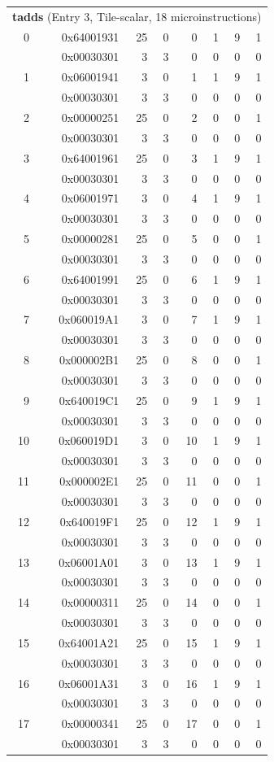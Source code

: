 \begin{longtable}{r r r r r r r r}
\multicolumn{8}{l}{\textbf{tadds} (Entry 3, Tile-scalar, 18 microinstructions)} \\
0 & 0x64001931 & 25 & 0 & 0 & 1 & 9 & 1 \\
  & 0x00030301 & 3 & 3 & 0 & 0 & 0 & 0 \\
1 & 0x06001941 & 3 & 0 & 1 & 1 & 9 & 1 \\
  & 0x00030301 & 3 & 3 & 0 & 0 & 0 & 0 \\
2 & 0x00000251 & 25 & 0 & 2 & 0 & 0 & 1 \\
  & 0x00030301 & 3 & 3 & 0 & 0 & 0 & 0 \\
3 & 0x64001961 & 25 & 0 & 3 & 1 & 9 & 1 \\
  & 0x00030301 & 3 & 3 & 0 & 0 & 0 & 0 \\
4 & 0x06001971 & 3 & 0 & 4 & 1 & 9 & 1 \\
  & 0x00030301 & 3 & 3 & 0 & 0 & 0 & 0 \\
5 & 0x00000281 & 25 & 0 & 5 & 0 & 0 & 1 \\
  & 0x00030301 & 3 & 3 & 0 & 0 & 0 & 0 \\
6 & 0x64001991 & 25 & 0 & 6 & 1 & 9 & 1 \\
  & 0x00030301 & 3 & 3 & 0 & 0 & 0 & 0 \\
7 & 0x060019A1 & 3 & 0 & 7 & 1 & 9 & 1 \\
  & 0x00030301 & 3 & 3 & 0 & 0 & 0 & 0 \\
8 & 0x000002B1 & 25 & 0 & 8 & 0 & 0 & 1 \\
  & 0x00030301 & 3 & 3 & 0 & 0 & 0 & 0 \\
9 & 0x640019C1 & 25 & 0 & 9 & 1 & 9 & 1 \\
  & 0x00030301 & 3 & 3 & 0 & 0 & 0 & 0 \\
10 & 0x060019D1 & 3 & 0 & 10 & 1 & 9 & 1 \\
  & 0x00030301 & 3 & 3 & 0 & 0 & 0 & 0 \\
11 & 0x000002E1 & 25 & 0 & 11 & 0 & 0 & 1 \\
  & 0x00030301 & 3 & 3 & 0 & 0 & 0 & 0 \\
12 & 0x640019F1 & 25 & 0 & 12 & 1 & 9 & 1 \\
  & 0x00030301 & 3 & 3 & 0 & 0 & 0 & 0 \\
13 & 0x06001A01 & 3 & 0 & 13 & 1 & 9 & 1 \\
  & 0x00030301 & 3 & 3 & 0 & 0 & 0 & 0 \\
14 & 0x00000311 & 25 & 0 & 14 & 0 & 0 & 1 \\
  & 0x00030301 & 3 & 3 & 0 & 0 & 0 & 0 \\
15 & 0x64001A21 & 25 & 0 & 15 & 1 & 9 & 1 \\
  & 0x00030301 & 3 & 3 & 0 & 0 & 0 & 0 \\
16 & 0x06001A31 & 3 & 0 & 16 & 1 & 9 & 1 \\
  & 0x00030301 & 3 & 3 & 0 & 0 & 0 & 0 \\
17 & 0x00000341 & 25 & 0 & 17 & 0 & 0 & 1 \\
  & 0x00030301 & 3 & 3 & 0 & 0 & 0 & 0 \\


\end{longtable}

